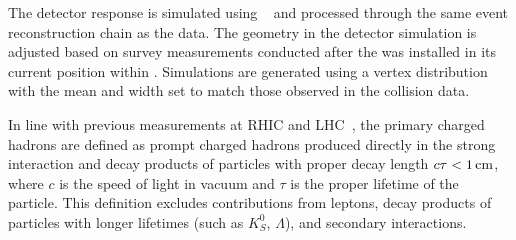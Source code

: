 The detector response is simulated using \geant~\cite{Geant4_cite} and processed through the same event reconstruction chain as the data. The \intt geometry in the detector simulation is adjusted based on survey measurements conducted after the \intt was installed in its current position within \sphenix. Simulations are generated using a vertex distribution with the mean and width set to match those observed in the collision data.

In line with previous measurements at RHIC and LHC~\cite{ALICE-PUBLIC-2017-005}, the primary charged hadrons are defined as prompt charged hadrons produced directly in the strong interaction and decay products of particles with proper decay length $c\tau < 1 \rm \,cm$, where $c$ is the speed of light in vacuum and $\tau$ is the proper lifetime of the particle. This definition excludes contributions from leptons, decay products of particles with longer lifetimes (such as $K_{S}^{0}$, $\Lambda$), and secondary interactions.